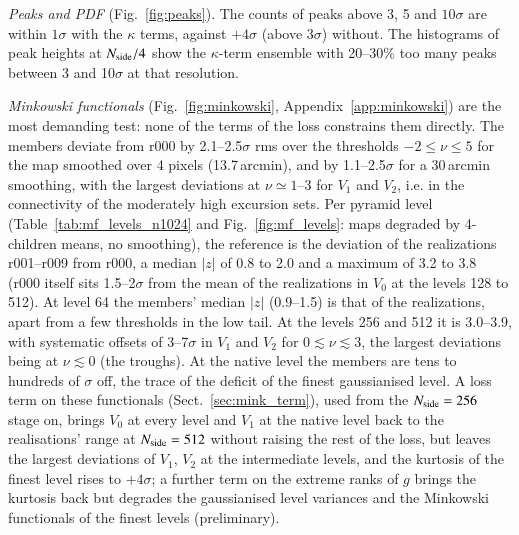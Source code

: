 \documentclass{aa}
\newcommand{\nsidefig}{1024}
\newcommand{\nside}{N_{\rm side}}
\begin{document}
\emph{Peaks and PDF} (Fig.~\ref{fig:peaks}). The counts of peaks above 3, 5 and $10\sigma$ are within $1\sigma$ with the $\kappa$ terms, against $+4\sigma$ (above $3\sigma$) without. The histograms of peak heights at $\nside/4$ show the $\kappa$-term ensemble with 20--30\% too many peaks between 3 and 10$\sigma$ at that resolution. %

\emph{Minkowski functionals} (Fig.~\ref{fig:minkowski}, Appendix~\ref{app:minkowski}) are the most demanding test: none of the terms of the loss constrains them directly. The members deviate from r000 by 2.1--2.5$\sigma$ rms over the thresholds $-2\le\nu\le5$ for the map smoothed over 4 pixels (13.7\,arcmin), and by 1.1--2.5$\sigma$ for a 30\,arcmin smoothing, with the largest deviations at $\nu\simeq1$--3 for $V_1$ and $V_2$, i.e. in the connectivity of the moderately high excursion sets. %
Per pyramid level (Table~\ref{tab:mf_levels_n\nsidefig} and Fig.~\ref{fig:mf_levels}: maps degraded by 4-children means, no smoothing), the reference is the deviation of the realizations r001--r009 from r000, a median $|z|$ of 0.8 to 2.0 and a maximum of 3.2 to 3.8 (r000 itself sits 1.5--2$\sigma$ from the mean of the realizations in $V_0$ at the levels 128 to 512). At level 64 the members' median $|z|$ (0.9--1.5) is that of the realizations, apart from a few thresholds in the low tail. At the levels 256 and 512 it is 3.0--3.9, with systematic offsets of 3--7$\sigma$ in $V_1$ and $V_2$ for $0\lesssim\nu\lesssim3$, the largest deviations being at $\nu\lesssim0$ (the troughs). At the native level the members are tens to hundreds of $\sigma$ off, the trace of the deficit of the finest gaussianised level. %
A loss term on these functionals (Sect.~\ref{sec:mink_term}), used from the $\nside=256$ stage on, brings $V_0$ at every level and $V_1$ at the native level back to the realisations' range at $\nside=512$ without raising the rest of the loss, but leaves the largest deviations of $V_1$, $V_2$ at the intermediate levels, and the kurtosis of the finest level rises to $+4\sigma$; a further term on the extreme ranks of $g$ brings the kurtosis back but degrades the gaussianised level variances and the Minkowski functionals of the finest levels (preliminary).
\end{document}
